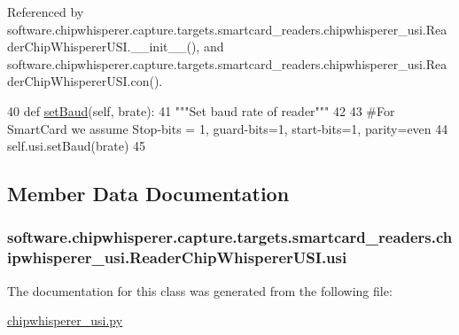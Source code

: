Referenced by software.\+chipwhisperer.\+capture.\+targets.\+smartcard\+\_\+readers.\+chipwhisperer\+\_\+usi.\+Reader\+Chip\+Whisperer\+U\+S\+I.\+\_\+\+\_\+init\+\_\+\+\_\+(), and software.\+chipwhisperer.\+capture.\+targets.\+smartcard\+\_\+readers.\+chipwhisperer\+\_\+usi.\+Reader\+Chip\+Whisperer\+U\+S\+I.\+con().


\begin{DoxyCode}
40     \textcolor{keyword}{def }\hyperlink{classsoftware_1_1chipwhisperer_1_1capture_1_1targets_1_1smartcard__readers_1_1chipwhisperer__usi_1_1ReaderChipWhispererUSI_a00a1cc6b550ee5aa5899571083294438}{setBaud}(self, brate):
41         \textcolor{stringliteral}{"""Set baud rate of reader"""}
42 
43         \textcolor{comment}{#For SmartCard we assume Stop-bits = 1, guard-bits=1, start-bits=1, parity=even}
44         self.usi.setBaud(brate)
45 
\end{DoxyCode}


\subsection{Member Data Documentation}
\hypertarget{classsoftware_1_1chipwhisperer_1_1capture_1_1targets_1_1smartcard__readers_1_1chipwhisperer__usi_1_1ReaderChipWhispererUSI_a53b8f716a52ef6f2bb55b3e055b94c63}{}
\subsubsection[{usi}]{\setlength{\rightskip}{0pt plus 5cm}software.\+chipwhisperer.\+capture.\+targets.\+smartcard\+\_\+readers.\+chipwhisperer\+\_\+usi.\+Reader\+Chip\+Whisperer\+U\+S\+I.\+usi}\label{classsoftware_1_1chipwhisperer_1_1capture_1_1targets_1_1smartcard__readers_1_1chipwhisperer__usi_1_1ReaderChipWhispererUSI_a53b8f716a52ef6f2bb55b3e055b94c63}


The documentation for this class was generated from the following file\+:\begin{DoxyCompactItemize}
\item 
\hyperlink{chipwhisperer__usi_8py}{chipwhisperer\+\_\+usi.\+py}\end{DoxyCompactItemize}
